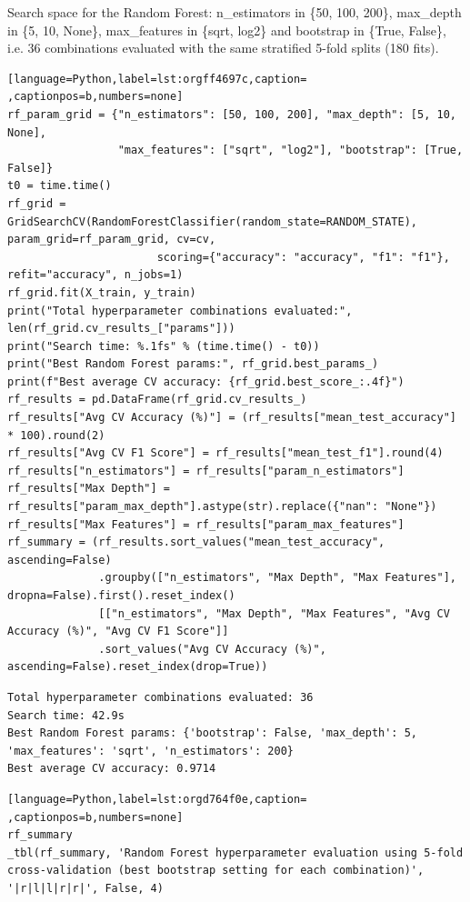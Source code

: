 \documentclass[11pt]{article}
\begin{document}
Search space for the Random Forest: n\_estimators in \{50, 100, 200\}, max\_depth in \{5, 10,
None\}, max\_features in \{sqrt, log2\} and bootstrap in \{True, False\}, i.e. 36 combinations
evaluated with the same stratified 5-fold splits (180 fits).
\begin{lstlisting}[language=Python,label=lst:orgff4697c,caption= ,captionpos=b,numbers=none]
rf_param_grid = {"n_estimators": [50, 100, 200], "max_depth": [5, 10, None],
                 "max_features": ["sqrt", "log2"], "bootstrap": [True, False]}
t0 = time.time()
rf_grid = GridSearchCV(RandomForestClassifier(random_state=RANDOM_STATE), param_grid=rf_param_grid, cv=cv,
                       scoring={"accuracy": "accuracy", "f1": "f1"}, refit="accuracy", n_jobs=1)
rf_grid.fit(X_train, y_train)
print("Total hyperparameter combinations evaluated:", len(rf_grid.cv_results_["params"]))
print("Search time: %.1fs" % (time.time() - t0))
print("Best Random Forest params:", rf_grid.best_params_)
print(f"Best average CV accuracy: {rf_grid.best_score_:.4f}")
rf_results = pd.DataFrame(rf_grid.cv_results_)
rf_results["Avg CV Accuracy (%)"] = (rf_results["mean_test_accuracy"] * 100).round(2)
rf_results["Avg CV F1 Score"] = rf_results["mean_test_f1"].round(4)
rf_results["n_estimators"] = rf_results["param_n_estimators"]
rf_results["Max Depth"] = rf_results["param_max_depth"].astype(str).replace({"nan": "None"})
rf_results["Max Features"] = rf_results["param_max_features"]
rf_summary = (rf_results.sort_values("mean_test_accuracy", ascending=False)
              .groupby(["n_estimators", "Max Depth", "Max Features"], dropna=False).first().reset_index()
              [["n_estimators", "Max Depth", "Max Features", "Avg CV Accuracy (%)", "Avg CV F1 Score"]]
              .sort_values("Avg CV Accuracy (%)", ascending=False).reset_index(drop=True))
\end{lstlisting}

\begin{verbatim}
Total hyperparameter combinations evaluated: 36
Search time: 42.9s
Best Random Forest params: {'bootstrap': False, 'max_depth': 5, 'max_features': 'sqrt', 'n_estimators': 200}
Best average CV accuracy: 0.9714
\end{verbatim}

\begin{lstlisting}[language=Python,label=lst:orgd764f0e,caption= ,captionpos=b,numbers=none]
rf_summary
_tbl(rf_summary, 'Random Forest hyperparameter evaluation using 5-fold cross-validation (best bootstrap setting for each combination)', '|r|l|l|r|r|', False, 4)
\end{lstlisting}
\end{document}
